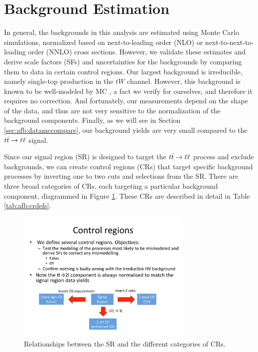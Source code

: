 
\section{Background Estimation}
\label{sec:afb:background}

In general, the backgrounds in this analysis are estimated using Monte
Carlo simulations, normalized based on next-to-leading order (NLO) or
next-to-next-to-leading order (NNLO) cross sections. However, we
validate these estimates and
derive scale factors (SFs) and uncertainties for the backgrounds by
comparing them to data in certain control regions. Our largest
background is irreducible, namely single-top production
in the $tW$ channel. However, this background is known to be
well-modeled by MC \cite{twxsec}, a fact we verify for ourselves, and
therefore it requires no correction.
And fortunately, our measurements depend on the shape of the data, and
thus are not very sensitive to the normalization of the background
components. Finally, as we will see in Section
\ref{sec:afb:datamccompare}, our background yields are very small
compared to the $t\bar{t} \rightarrow \ell\ell$ signal.

Since our signal region (SR) is designed to target the $t\bar{t} \rightarrow \ell\ell$
process and exclude backgrounds, we can create control regions (CRs)
that target specific background processes by inverting one to two cuts
and selections from the SR. There are three broad categories of CRs,
each targeting a particular background component,
diagrammed in Figure \ref{fig:afb:crs}. These CRs are described in
detail in Table \ref{tab:afb:crdefs}.

\vspace{0.25in}
\begin{figure}[htb]
  \centering
  \includegraphics[width=0.75\textwidth]{figures/CRsdef.pdf}
  \caption{Relationships between the SR and the different categories of CRs.}
  \label{fig:afb:crs}
\end{figure}


